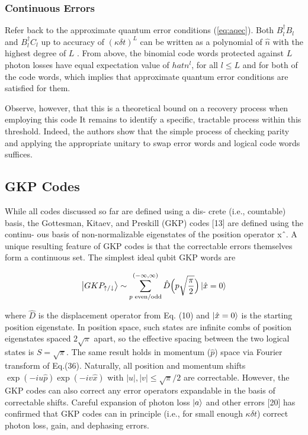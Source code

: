 \documentclass[12]{amsart}
\newcommand\0{\mathbf{0}}
\newcommand\<{\langle}
\renewcommand\>{\rangle}
\begin{document}
\subsubsection{Continuous Errors}

Refer back to the approximate quantum error conditions (\ref{eq:aqec}). Both $B_l^\dag B_l$ and $B_l^\dag C_l$ up to accuracy of $(\kappa \delta t)^L$ can be written as a polynomial of $\hat{n}$ with the highest degree of $L$ \cite{michael2016new}. From above, the binomial code words protected against $L$ photon losses have equal expectation value of $hat{n}^l$, for all $l \leq L$ and for both of the code words, which implies that approximate quantum error conditions are satisfied for them.

Observe, however, that this is a theoretical bound on a recovery process when employing this code It remains to identify a specific, tractable process within this threshold. Indeed, the authors show that the simple process of checking parity and applying the appropriate unitary to swap error words and logical code words suffices.
\subsection{GKP Codes}

While all codes discussed so far are defined using a dis- crete (i.e., countable) basis, the Gottesman, Kitaev, and Preskill (GKP) codes [13] are defined using the continu- ous basis of non-normalizable eigenstates of the position operator xˆ. A unique resulting feature of GKP codes is that the correctable errors themselves form a continuous set. The simplest ideal qubit GKP words are

\begin{align*}
\ket{GKP_{\uparrow/\downarrow}} \sim \sum_{p\text{ even/odd}}^{(-\infty, \infty)} \hat{D}\Big(p \sqrt{\frac{\pi}{2}} \Big) \ket{\hat{x} = 0} 	
\end{align*}


  where $\hat{D}$ is the displacement operator from Eq. (10) and $\ket{\hat{x} = 0}$ is the starting position eigenstate. In position space, such states are infinite combs of position eigenstates spaced $2\sqrt{\pi}$ apart, so the effective spacing between the two logical states is $S=\sqrt{\pi}$. The same result holds in momentum ($\hat{p}$) space via Fourier transform of Eq.(36). Naturally, all position and momentum shifts $\exp(-iu\hat{p})\exp(-iv\hat{x})$ with $|u|, |v| \leq \sqrt{\pi}/2$ are correctable. However, the GKP codes can also correct any error operators expandable in the basis of correctable shifts. Careful expansion of photon loss $\ket{a}$ and other errors [20] has confirmed that GKP codes can in principle (i.e., for small enough $\kappa \delta t$) correct photon loss, gain, and dephasing errors.
  
\end{document}
